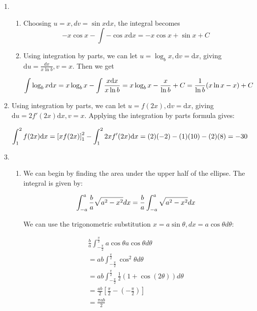 \begin{enumerate}
\item 
\begin{enumerate}
    \item Choosing $u=x, dv=\sin{x}\mathrm dx$, the integral becomes 
    \[
    -x\cos{x} - \int-\cos{x}\mathrm dx
    =-x\cos{x} + \sin{x} + C
    \]

    \item Using integration by parts, we can let $u = \log_b x, \mathrm dv = \mathrm dx$, giving $\mathrm du = \frac{dx}{x\ln b}, v = x$. Then we get
		
		\[
			\int\log_b x \mathrm dx \\
			= x\log_b x - \int\frac{x\mathrm dx}{x\ln b} \\
			= x\log_b x - \frac{x}{\ln b} + C \\
			= \frac{1}{\ln b}(x\ln x - x) + C
		\]
\end{enumerate}
\item
Using integration by parts, we can let $u = f(2x), \mathrm dv = \mathrm dx$, giving $\mathrm du = 2f'(2x)\mathrm dx, v = x$. Applying the integration by parts formula gives:
        
        \[
            \int_1^2 f(2x)\mathrm dx \\
            = \left[xf(2x)\right]_1^2 - \int_1^2 2xf'(2x)\mathrm dx \\
            = (2)(-2) - (1)(10) - (2)(8) \\
            = -30
        \]

\item 
\begin{enumerate}
    \item We can begin by finding the area under the upper half of the ellipse. The integral is given by:
	    
	    \[
	        \int_{-a}^a \frac{b}{a}\sqrt{a^2-x^2}dx\\
	        =\frac{b}{a}\int_{-a}^a\sqrt{a^2-x^2}dx
	    \]
	    
	    We can use the trigonometric substitution $x = a\sin{\theta}, dx = a\cos{\theta}d\theta$:
	    
	    \begin{align*}
	        \frac{b}{a}\int_{-\frac{\pi}{2}}^\frac{\pi}{2}a\cos{\theta}a\cos{\theta}d\theta \\
	        = ab\int_{-\frac{\pi}{2}}^\frac{\pi}{2}\cos^2{\theta}d\theta\\
	        = ab\int_{-\frac{\pi}{2}}^\frac{\pi}{2}\frac{1}{2}(1+\cos{(2\theta)})d\theta\\
	        = \frac{ab}{2}\left[\frac{\pi}{2}-(-\frac{\pi}{2})\right]\\
	        = \frac{\pi ab}{2}
	    \end{align*}
	    

\end{enumerate}
\end{enumerate}

